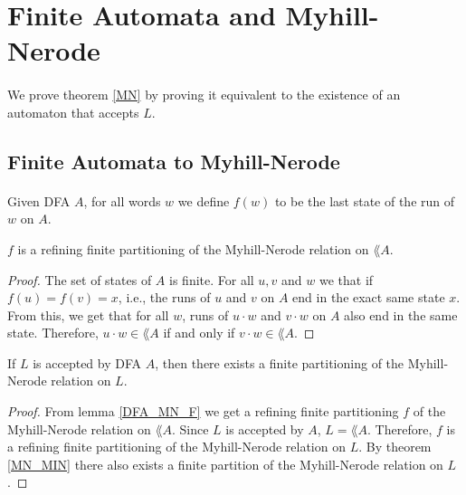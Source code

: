 \documentclass[11pt,a4paper,oneside]{book}
\begin{document}



        \section{Finite Automata and Myhill-Nerode}

            \paragraph{}
                We prove theorem \ref{MN} by proving it equivalent to the existence of an automaton that accepts $L$.
                

            
            \subsection{Finite Automata to Myhill-Nerode}
                \paragraph{}
                    Given DFA $A$, for all words $w$ we define $f(w)$ to be the last state of the run of $w$ on $A$.

                \begin{lemma} 
                    \label{DFA_MN_F}
                    $f$ is a refining finite partitioning of the Myhill-Nerode relation on $\lang{A}$. 
                \end{lemma} 
                \begin{proof} 
                    The set of states of $A$ is finite.
                    For all $u, v$ and $w$ we that if $f(u) = f(v) = x$, i.e.,
                    the runs of $u$ and $v$ on $A$ end in the exact same state $x$.
                    From this, we get that for all $w$, runs of $u \cdot w$ and $v \cdot w$ on $A$ also end in the same state.
                    Therefore, $u\cdot w \in \lang{A}$ if and only if $v \cdot w \in \lang{A}$.
                \end{proof}

                \begin{theorem}
                    If $L$ is accepted by DFA $A$, then there exists a finite partitioning of the Myhill-Nerode relation on $L$.
                \end{theorem}
                \begin{proof}
                    From lemma \ref{DFA_MN_F} we get a refining finite partitioning $f$ of the Myhill-Nerode relation on $\lang{A}$. 
                    Since $L$ is accepted by $A$, $L = \lang{A}$. 
                    Therefore, $f$ is a refining finite partitioning of the Myhill-Nerode relation on $L$.
                    By theorem \ref{MN_MIN} there also exists a finite partition of the Myhill-Nerode relation on $L$.
                \end{proof}
\end{document}

